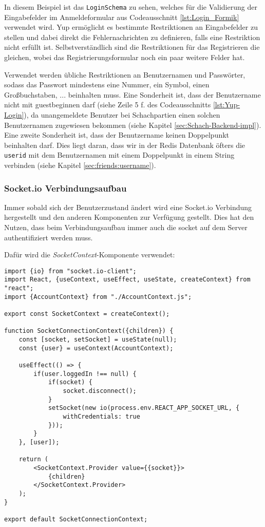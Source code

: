 In diesem Beispiel ist das \verb|LoginSchema| zu sehen, welches für die Validierung der Eingabefelder im Anmeldeformular aus Codeausschnitt \ref{lst:Login_Formik} verwendet wird. Yup ermöglicht es bestimmte Restriktionen an Eingabefelder zu stellen und dabei direkt die Fehlernachrichten zu definieren, falls eine Restriktion nicht erfüllt ist. Selbstverständlich sind die Restriktionen für das Registrieren die gleichen, wobei das Registrierungsformular noch ein paar weitere Felder hat.

Verwendet werden übliche Restriktionen an Benutzernamen und Passwörter, sodass das Passwort mindestens eine Nummer, ein Symbol, einen Großbuchstaben, ... beinhalten muss. Eine Sonderheit ist, dass der Benutzername nicht mit \glqq guest\grqq{ }beginnen darf (siehe Zeile 5 f. des Codeausschnitts \ref{lst:Yup-Login}), da unangemeldete Benutzer bei Schachpartien einen solchen Benutzernamen zugewiesen bekommen (siehe Kapitel \ref{sec:Schach-Backend-impl}). Eine zweite Sonderheit ist, dass der Benutzername keinen Doppelpunkt beinhalten darf. Dies liegt daran, dass wir in der Redis Datenbank öfters die \verb|userid| mit dem Benutzernamen mit einem Doppelpunkt in einem String verbinden (siehe Kapitel \ref{sec:friends:username}).


\subsubsection{Socket.io Verbindungsaufbau}
\label{sec:socket-Verbindung}
Immer sobald sich der Benutzerzustand ändert wird eine Socket.io Verbindung hergestellt und den anderen Komponenten zur Verfügung gestellt. Dies hat den Nutzen, dass beim Verbindungsaufbau immer auch die socket auf dem Server authentifiziert werden muss.

Dafür wird die \textit{SocketContext}-Komponente verwendet:

\begin{lstlisting}[style=codeStyle, caption={Die Datei \textit{SocketContext.js}}, label={lst:SocketContext}]
import {io} from "socket.io-client";
import React, {useContext, useEffect, useState, createContext} from "react";
import {AccountContext} from "./AccountContext.js";

export const SocketContext = createContext();

function SocketConnectionContext({children}) {
    const [socket, setSocket] = useState(null);
    const {user} = useContext(AccountContext);

    useEffect(() => {
        if(user.loggedIn !== null) {
            if(socket) {
                socket.disconnect();
            }
            setSocket(new io(process.env.REACT_APP_SOCKET_URL, {
                withCredentials: true
            }));
        }
    }, [user]);

    return (
        <SocketContext.Provider value={{socket}}>
            {children}
        </SocketContext.Provider>
    );
}

export default SocketConnectionContext;
\end{lstlisting}

